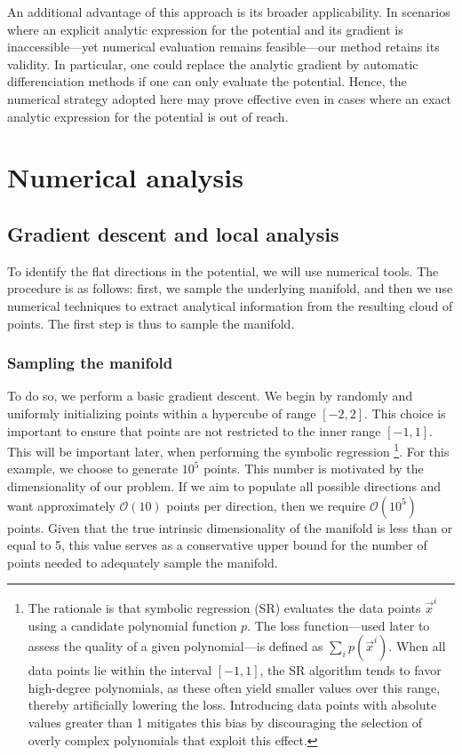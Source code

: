 \documentclass[11pt]{article}
\newcommand{\bd}[1]{\marginpar{\parbox{\marginparwidth}{\boldmath $\Longleftarrow$}}{\boldmath\bfseries (bd: #1)}}
\begin{document}
An additional advantage of this approach is its broader applicability. In scenarios where an explicit analytic expression for the potential and its gradient is inaccessible—yet numerical evaluation remains feasible—our method retains its validity. In particular, one could replace the analytic gradient by automatic differenciation methods if one can only evaluate the potential. Hence, the numerical strategy adopted here may prove effective even in cases where an exact analytic expression for the potential is out of reach. \bd{other motivation? Example of this ? }

\section{Numerical analysis}
	\subsection{Gradient descent and local analysis}
		To identify the flat directions in the potential, we will use numerical tools. The procedure is as follows: first, we sample the underlying manifold, and then we use numerical techniques to extract analytical information from the resulting cloud of points. The first step is thus to sample the manifold.
			\subsubsection{Sampling the manifold}

		
		To do so, we perform a basic gradient descent. We begin by randomly and uniformly initializing points within a hypercube of range $[-2,2]$. This choice is important to ensure that points are not restricted to the inner range $[-1,1]$. This will be important later, when performing the symbolic regression \footnote{The rationale is that symbolic regression (SR) evaluates the data points ${\vec{x}^i}$ using a candidate polynomial function $p$. The loss function—used later to assess the quality of a given polynomial—is defined as $\sum_i p(\vec{x}^i)$. When all data points lie within the interval $[-1, 1]$, the SR algorithm tends to favor high-degree polynomials, as these often yield smaller values over this range, thereby artificially lowering the loss. Introducing data points with absolute values greater than 1 mitigates this bias by discouraging the selection of overly complex polynomials that exploit this effect.}. For this example, we choose to generate $10^5$ points. This number is motivated by the dimensionality of our problem. If we aim to populate all possible directions and want approximately $\mathcal{O}(10)$ points per direction, then we require $\mathcal{O}(10^5)$ points. Given that the true intrinsic dimensionality of the manifold is less than or equal to 5, this value serves as a conservative upper bound for the number of points needed to adequately sample the manifold.
		
\end{document}
